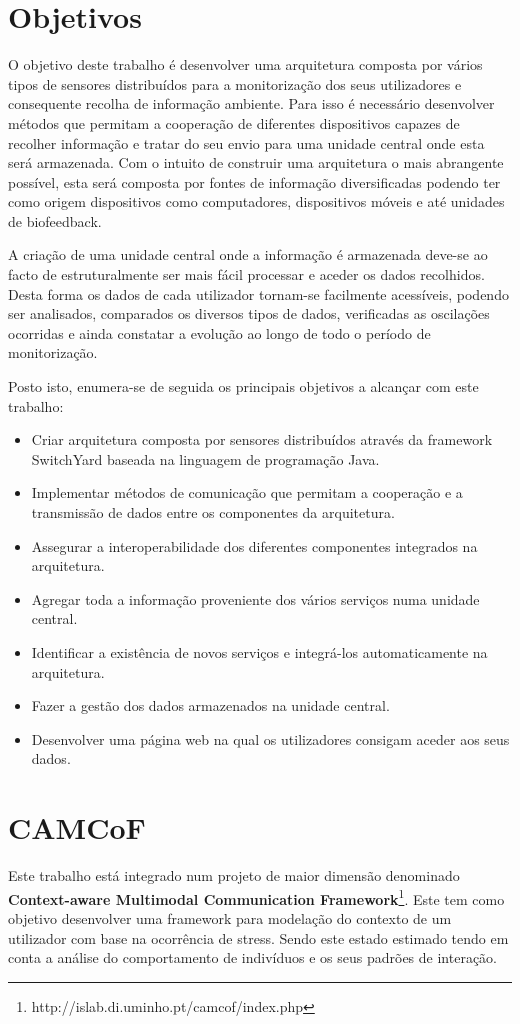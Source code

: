\section{Objetivos}

O objetivo deste trabalho é desenvolver uma arquitetura composta por vários tipos de sensores distribuídos para a monitorização dos seus utilizadores e consequente recolha de informação ambiente. Para isso é necessário desenvolver métodos que permitam a cooperação de diferentes dispositivos capazes de recolher informação e tratar do seu envio para uma unidade central onde esta será armazenada. Com o intuito de construir uma arquitetura o mais abrangente possível, esta será composta por fontes de informação diversificadas podendo ter como origem dispositivos como computadores, dispositivos móveis e até unidades de biofeedback.

A criação de uma unidade central onde a informação é armazenada deve-se ao facto de estruturalmente ser mais fácil processar e aceder os dados recolhidos. Desta forma os dados de cada utilizador tornam-se facilmente acessíveis, podendo ser analisados, comparados os diversos tipos de dados, verificadas as oscilações ocorridas e ainda constatar a evolução ao longo de todo o período de monitorização.

Posto isto, enumera-se de seguida os principais objetivos a alcançar com este trabalho:
\begin{itemize}
  \item Criar arquitetura composta por sensores distribuídos através da framework SwitchYard baseada na linguagem de programação Java.
  \item Implementar métodos de comunicação que permitam a cooperação e a transmissão de dados entre os componentes da arquitetura.
  \item Assegurar a interoperabilidade dos diferentes componentes integrados na arquitetura.
  \item Agregar toda a informação proveniente dos vários serviços numa unidade central.
  \item Identificar a existência de novos serviços e integrá-los automaticamente na arquitetura.
  \item Fazer a gestão dos dados armazenados na unidade central.
  \item Desenvolver uma página web na qual os utilizadores consigam aceder aos seus dados.
  \end{itemize}


\section{CAMCoF}
Este trabalho está integrado num projeto de maior dimensão denominado \textbf{Context-aware Multimodal Communication Framework}\footnote{http://islab.di.uminho.pt/camcof/index.php}. Este tem como objetivo desenvolver uma framework para modelação do contexto de um utilizador com base na ocorrência de stress. Sendo este estado estimado tendo em conta a análise do comportamento de indivíduos e os seus padrões de interação.

